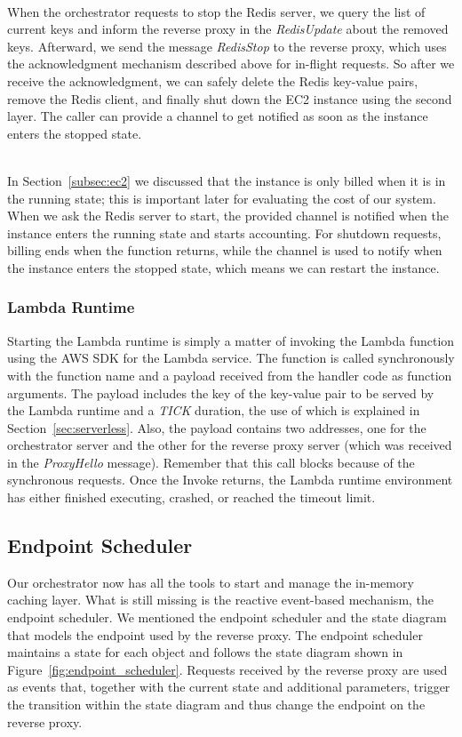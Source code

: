 ~\\
When the orchestrator requests to stop the Redis server, we query the list of current keys and inform the reverse proxy in the \emph{RedisUpdate} about the removed keys. Afterward, we send the message \emph{RedisStop} to the reverse proxy, which uses the acknowledgment mechanism described above for in-flight requests. So after we receive the acknowledgment, we can safely delete the Redis key-value pairs, remove the Redis client, and finally shut down the EC2 instance using the second layer. The caller can provide a channel to get notified as soon as the instance enters the stopped state.

~\\
In Section~\ref{subsec:ec2} we discussed that the instance is only billed when it is in the running state; this is important later for evaluating the cost of our system. When we ask the Redis server to start, the provided channel is notified when the instance enters the running state and starts accounting. For shutdown requests, billing ends when the function returns, while the channel is used to notify when the instance enters the stopped state, which means we can restart the instance.

\subsubsection{Lambda Runtime} 
Starting the Lambda runtime is simply a matter of invoking the Lambda function using the AWS SDK for the Lambda service. The function is called synchronously with the function name and a payload received from the handler code as function arguments. The payload includes the key of the key-value pair to be served by the Lambda runtime and a \emph{TICK} duration, the use of which is explained in Section~\ref{sec:serverless}. Also, the payload contains two addresses, one for the orchestrator server and the other for the reverse proxy server (which was received in the \emph{ProxyHello} message). Remember that this call blocks because of the synchronous requests. Once the Invoke returns, the Lambda runtime environment has either finished executing, crashed, or reached the timeout limit.

\subsection{Endpoint Scheduler}
\label{subsec:endpoint_scheduler}
Our orchestrator now has all the tools to start and manage the in-memory caching layer. What is still missing is the reactive event-based mechanism, the endpoint scheduler. We mentioned the endpoint scheduler and the state diagram that models the endpoint used by the reverse proxy. The endpoint scheduler maintains a state for each object and follows the state diagram shown in Figure~\ref{fig:endpoint_scheduler}. Requests received by the reverse proxy are used as events that, together with the current state and additional parameters, trigger the transition within the state diagram and thus change the endpoint on the reverse proxy. 

